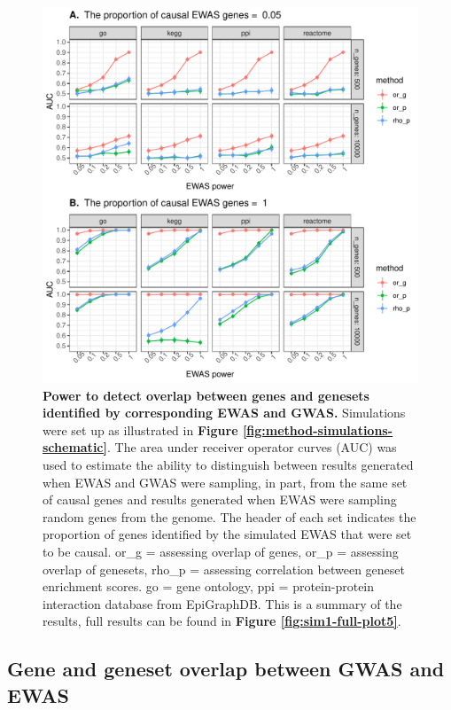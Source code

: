 \documentclass[11pt,oneside]{bristolthesis}
\begin{document}
\begin{figure}

{\centering \includegraphics[width=1\linewidth]{figure/06-ewas_gwas_comparison/methods_test_gene_up_auc_plot_all_databases_summary} 

}

\caption[Power to detect overlap between genes and genesets identified by corresponding EWAS and GWAS]{\textbf{Power to detect overlap between genes and genesets identified by corresponding EWAS and GWAS.} Simulations were set up as illustrated in \textbf{Figure \ref{fig:method-simulations-schematic}}. The area under receiver operator curves (AUC) was used to estimate the ability to distinguish between results generated when EWAS and GWAS were sampling, in part, from the same set of causal genes and results generated when EWAS were sampling random genes from the genome. The header of each set indicates the proportion of genes identified by the simulated EWAS that were set to be causal. or\_g = assessing overlap of genes, or\_p = assessing overlap of genesets, rho\_p = assessing correlation between geneset enrichment scores. go = gene ontology, ppi = protein-protein interaction database from EpiGraphDB. This is a summary of the results, full results can be found in \textbf{Figure \ref{fig:sim1-full-plot5}}.}\label{fig:sim1-summ-plot}
\end{figure}
\hypertarget{gwas-ewas-overlap}{%
\subsection{Gene and geneset overlap between GWAS and EWAS}\label{gwas-ewas-overlap}}
\end{document}
